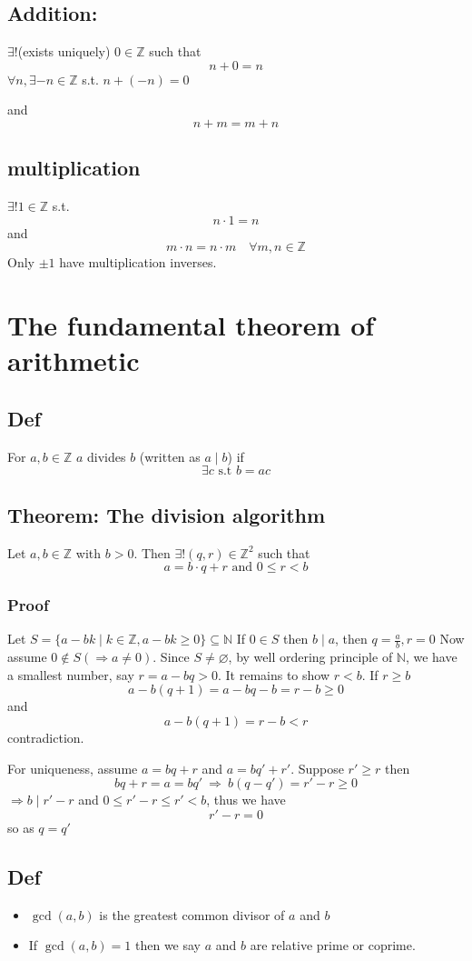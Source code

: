 \documentclass{book}
\begin{document}
\section{Addition:}
$\exists!$(exists uniquely) $0\in\mathbb{Z}$ such that $$n+0=n$$$\forall n,\exists-n\in \mathbb{Z}$ s.t. $n+(-n)=0$

and
$$n+m=m+n$$
\section{multiplication}
$\exists! 1\in \mathbb{Z}$ s.t. $$n\cdot 1=n$$
and $$m\cdot n=n \cdot m\quad \forall m,n\in \mathbb{Z}$$
Only $\pm 1$ have multiplication inverses.
\chapter{The fundamental theorem of arithmetic}
\section{Def}
For $a,b\in \mathbb{Z}$ $a$ divides $b$ (written as $a\mid b$) if
$$\exists c\text{ s.t }b=ac$$
\section{Theorem: The division algorithm}
\label{division theorem}
Let $a,b\in \mathbb{Z}$ with $b>0$. Then $\exists! (q,r)\in \mathbb{Z}^2$ such that
$$a=b\cdot q+r\text{ and }0\leq r<b$$
\subsection*{Proof}
Let $S=\{a-bk\mid k\in \mathbb{Z},a-bk\geq 0\}\subseteq \mathbb{N}$
If $0\in S$ then $b\mid a$, then $q=\frac{a}b,r=0$
Now assume $0\not\in S(\Rightarrow a\neq 0)$. Since $S\neq\varnothing$, by well ordering principle of $\mathbb{N}$, we have a smallest number, say $r=a-bq>0$. It remains to show $r<b$.
If $r\geq b$ $$a-b(q+1)=a-bq-b=r-b\geq 0$$ and$$a-b(q+1)=r-b<r$$ contradiction.

For uniqueness, assume $a=bq+r$ and $a=bq'+r'$. Suppose $r'\geq r$ then $$bq+r=a=bq'\ \Rightarrow\ b(q-q')=r'-r\geq 0$$
$\Rightarrow b\mid r'-r$ and $0\leq r'-r\leq r'<b$, thus we have
$$r'-r=0$$ so as $q=q'$
\section{Def}
\begin{itemize}
	\item $\gcd (a,b)$ is the greatest common divisor of $a$ and $b$
	\item If $\gcd (a,b)=1$ then we say $a$ and $b$ are relative prime or coprime.
\end{itemize}
\end{document}
